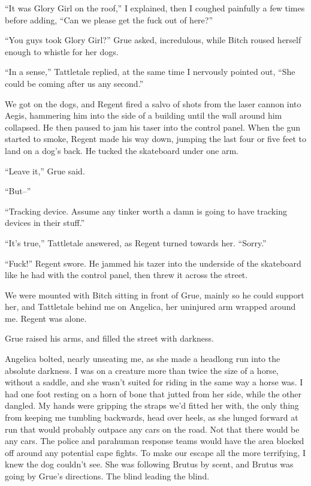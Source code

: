 ``It was Glory Girl on the roof,'' I explained, then I coughed painfully a few times before adding, ``Can we please get the fuck out of here?''



``You guys took Glory Girl?'' Grue asked, incredulous, while Bitch roused herself enough to whistle for her dogs.



``In a sense,'' Tattletale replied, at the same time I nervously pointed out, ``She could be coming after us any second.''



We got on the dogs, and Regent fired a salvo of shots from the laser cannon into Aegis, hammering him into the side of a building until the wall around him collapsed.  He then paused to jam his taser into the control panel.  When the gun started to smoke, Regent made his way down, jumping the last four or five feet to land on a dog's back.  He tucked the skateboard under one arm.



``Leave it,'' Grue said.



``But--''



``Tracking device.  Assume any tinker worth a damn is going to have tracking devices in their stuff.''



``It's true,'' Tattletale answered, as Regent turned towards her.  ``Sorry.''



``Fuck!'' Regent swore.  He jammed his tazer into the underside of the skateboard like he had with the control panel, then threw it across the street.



We were mounted with Bitch sitting in front of Grue, mainly so he could support her, and Tattletale behind me on Angelica, her uninjured arm wrapped around me.  Regent was alone.



Grue raised his arms, and filled the street with darkness.



Angelica bolted, nearly unseating me, as she made a headlong run into the absolute darkness.  I was on a creature more than twice the size of a horse, without a saddle, and she wasn't suited for riding in the same way a horse was.  I had one foot resting on a horn of bone that jutted from her side, while the other dangled.  My hands were gripping the straps we'd fitted her with, the only thing from keeping me tumbling backwards, head over heels, as she lunged forward at run that would probably outpace any cars on the road.  Not that there would be any cars.  The police and parahuman response teams would have the area blocked off around any potential cape fights.  To make our escape all the more terrifying, I knew the dog couldn't see.  She was following Brutus by scent, and Brutus was going by Grue's directions.  The blind leading the blind.



